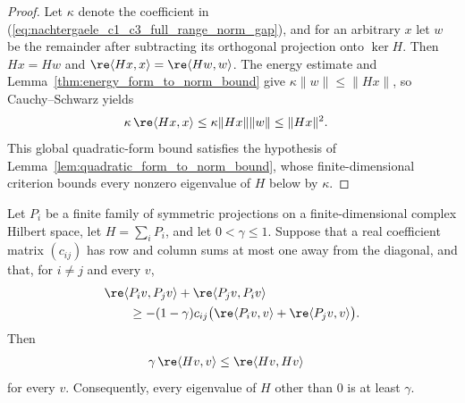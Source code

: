 \begin{proof}
    \leanok
    Let $\kappa$ denote the coefficient in
    (\ref{eq:nachtergaele_c1_c3_full_range_norm_gap}), and for an
    arbitrary $x$ let $w$ be the remainder after subtracting its orthogonal
    projection onto $\ker H$. Then $Hx=Hw$ and
    $\re\langle Hx,x\rangle=\re\langle Hw,w\rangle$. The energy estimate and
    Lemma~\ref{thm:energy_form_to_norm_bound} give
    $\kappa\lVert w\rVert\leq\lVert Hx\rVert$, so Cauchy--Schwarz yields
    \begin{align}
        \kappa\,\re\langle Hx,x\rangle
         & \leq \kappa\lVert Hx\rVert\lVert w\rVert
        \leq \lVert Hx\rVert^2.
    \end{align}
    This global quadratic-form bound satisfies the hypothesis of
    Lemma~\ref{lem:quadratic_form_to_norm_bound}, whose finite-dimensional
    criterion bounds every nonzero eigenvalue of $H$ below by $\kappa$.
\end{proof}

\begin{lemma}
    \label{thm:martingale_criterion}
    \leanok
    Let $P_i$ be a finite family of symmetric projections on a
    finite-dimensional complex Hilbert space, let $H=\sum_iP_i$, and let
    $0<\gamma\le1$.  Suppose that a real coefficient matrix $(c_{ij})$ has row
    and column sums at most one away from the diagonal, and that, for $i\ne j$
    and every $v$,
    \begin{align}
         & \re\langle P_i v,P_jv\rangle
        +\re\langle P_jv,P_iv\rangle    \\
         & \qquad\ge
        -(1-\gamma)c_{ij}
        \bigl(\re\langle P_iv,v\rangle
        +\re\langle P_jv,v\rangle\bigr).
        \label{eq:ph_martingale_condition}
    \end{align}
    Then
    \begin{align}
        \gamma\,\re\langle Hv,v\rangle
         & \le \re\langle Hv,Hv\rangle
        \notag
    \end{align}
    for every $v$.  Consequently, every eigenvalue of $H$ other than $0$ is
    at least $\gamma$.
\end{lemma}

